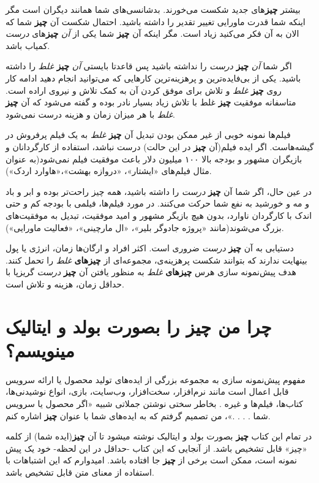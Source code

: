 بیشتر \textbf{چیز}های جدید شکست می‌خورند. بدشانسی‌های شما همانند دیگران
است مگر اینکه شما قدرت ماورایی تغییر تقدیر را داشته باشید. احتمال شکست
آن \textbf{چیز} شما که الان به آن فکر می‌کنید زیاد است. مگر اینکه آن
\textbf{چیز} شما یکی از \emph{آن} \textbf{چیز}های \emph{درست} کمیاب
باشد.

اگر شما \emph{آن} \textbf{چیز} \emph{درست} را نداشته باشید پس قاعدتا
بایستی \emph{آن} \textbf{چیز} \emph{غلط} را داشته باشید. یکی از
بی‌فایده‌ترین و پرهزینه‌ترین کارهایی که می‌توانید انجام دهید ادامه کار
روی \textbf{چیز} \emph{غلط} و تلاش برای موفق کردن آن به کمک تلاش و نیروی
اراده است. متاسفانه موفقیت \textbf{چیز} غلط با تلاش زیاد بسیار نادر بوده
و گفته می‌شود که آن \textbf{چیز} \emph{غلط} با هر میزان زمان و هزینه
درست نمی‌شود.

فیلم‌ها نمونه خوبی از غیر ممکن بودن تبدیل آن \textbf{چیز} \emph{غلط} به
یک فیلم پرفروش در گیشه‌هاست. اگر ایده فیلم(آن \textbf{چیز} در این حالت)
درست نباشد، استفاده از کارگردانان و بازیگران مشهور و بودجه بالا ۱۰۰
میلیون دلار باعث موفقیت فیلم نمی‌شود(به عنوان مثال فیلم‌های «ایشتار»،
«دروازه بهشت»،«هاوارد اردک»).

در عین حال، اگر شما آن \textbf{چیز} \emph{درست} را داشته باشید، همه چیز
راحت‌تر بوده و ابر و باد و مه و خورشید به نفع شما حرکت می‌کنند. در مورد
فیلم‌ها، فیلمی با بودجه کم و حتی اندک با کارگردان ناوارد، بدون هیچ
بازیگر مشهور و امید موفقیت، تبدیل به موفقیت‌های بزرگ می‌شوند(مانند
«پروژه جادوگر بلیر»، «ال مارچینی»، «فعالیت ماورایی»).

دستیابی به آن \textbf{چیز} \emph{درست} ضروری است. اکثر افراد و ارگان‌ها
زمان، انرژی یا پول بینهایت ندارند که بتوانند شکست پرهزینه‌ی، مجموعه‌ای
از \textbf{چیزهای} \emph{غلط} را تحمل کنند. هدف پیش‌نمونه سازی هرس
\textbf{چیزهای} \emph{غلط} به منظور یافتن آن \textbf{چیز} \emph{درست}
گریزپا با حداقل زمان، هزینه و تلاش است.

\section{چرا من \textbf{چیز} را بصورت بولد و ایتالیک
مینویسم؟}\label{ux686ux631ux627-ux645ux646-ux686ux6ccux632-ux631ux627-ux628ux635ux648ux631ux62a-ux628ux648ux644ux62f-ux648-ux627ux6ccux62aux627ux644ux6ccux6a9-ux645ux6ccux646ux648ux6ccux633ux645}

مفهوم پیش‌نمونه سازی به مجموعه بزرگی از ایده‌های تولید محصول یا ارائه
سرویس قابل اعمال است مانند نرم‌افزار، سخت‌افزار، وب‌سایت، بازی، انواع
نوشیدنی‌ها، کتاب‌ها، فیلم‌ها و غیره . بخاطر سختی نوشتن جملاتی شبیه «اگر
محصول یا سرویس شما . . . .»، من تصمیم گرفتم که به ایده‌های شما با عنوان
\textbf{چیز} اشاره کنم.

در تمام این کتاب \textbf{چیز} بصورت بولد و ایتالیک نوشته میشود تا آن
\textbf{چیز}(ایده شما) از کلمه «چیز» قابل تشخیص باشد. از آنجایی که این
کتاب -حداقل در این لحظه- خود یک پیش نمونه است، ممکن است برخی از
\textbf{چیز} جا افتاده باشد. امیدوارم که این اشتباهات با استفاده از
معنای متن قابل تشخیص باشد.
